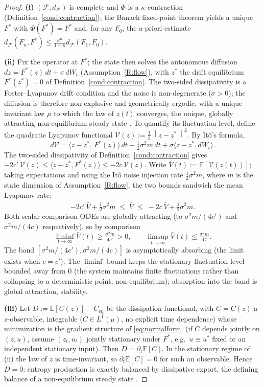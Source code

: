 \documentclass[11pt]{article}
\theoremstyle{plain}
\theoremstyle{definition}
\theoremstyle{remark}
\newcommand{\E}{\mathbb{E}}
\newcommand{\norm}[1]{\left\lVert#1\right\rVert}
\begin{document}
\begin{proof}
\textbf{(i)} $(\mathcal F,d_{\mathcal F})$ is complete and $\Phi$ is a $\kappa$-contraction (Definition~\ref{cond:contraction}); the Banach fixed-point theorem \citep{banach1922} yields a unique $F^*$ with $\Phi(F^*)=F^*$ and, for any $F_0$, the a-priori estimate $d_{\mathcal F}(F_n,F^*)\le\frac{\kappa^n}{1-\kappa}d_{\mathcal F}(F_1,F_0)$.

\textbf{(ii)} Fix the operator at $F^*$; the state then solves the autonomous diffusion $dz=F^*(z)\,dt+\sigma\,dW_t$ (Assumption~\ref{R:flow}), with $z^*$ the drift equilibrium $F^*(z^*)=0$ of Definition~\ref{cond:contraction}. The two-sided dissipativity is a Foster--Lyapunov drift condition and the noise is non-degenerate ($\sigma>0$); the diffusion is therefore non-explosive and geometrically ergodic, with a unique invariant law $\mu$ to which the law of $z(t)$ converges, the unique, globally attracting non-equilibrium steady state \citep{khasminskii2012,mattingly2002}. To quantify its fluctuation level, define the quadratic Lyapunov functional $\mathcal V(z):=\tfrac12\norm{z-z^*}^2$. By It\^o's formula,
\[
d\mathcal V=\big\langle z-z^*,\,F^*(z)\big\rangle\,dt+\tfrac12\sigma^2 m\,dt+\sigma\langle z-z^*,dW_t\rangle .
\]
The two-sided dissipativity of Definition~\ref{cond:contraction} gives $-2c'\,\mathcal V(z)\le\langle z-z^*,F^*(z)\rangle\le-2c\,\mathcal V(z)$. Write $\bar V(t):=\E[\mathcal V(z(t))]$; taking expectations and using the It\^o noise injection rate $\tfrac12\sigma^2 m$, where $m$ is the state dimension of Assumption~\ref{R:flow}, the two bounds sandwich the mean Lyapunov rate:
\[
-2c'\,\bar V+\tfrac12\sigma^2 m\;\le\;\dot{\bar V}\;\le\;-2c\,\bar V+\tfrac12\sigma^2 m .
\]
Both scalar comparison ODEs are globally attracting (to $\sigma^2 m/(4c')$ and $\sigma^2 m/(4c)$ respectively), so by comparison
\[
\liminf_{t\to\infty}\bar V(t)\ge\tfrac{\sigma^2 m}{4c'}>0,\qquad \limsup_{t\to\infty}\bar V(t)\le\tfrac{\sigma^2 m}{4c}.
\]
The band $[\sigma^2 m/(4c'),\sigma^2 m/(4c)]$ is asymptotically absorbing (the limit exists when $c=c'$). The $\liminf$ bound keeps the stationary fluctuation level bounded away from $0$ (the system maintains finite fluctuations rather than collapsing to a deterministic point, non-equilibrium); absorption into the band is global attraction, stability.

\textbf{(iii)} Let $D:=\E[C(z)]-C_{\mathrm{eq}}$ be the dissipation functional, with $C=C(z)$ a $z$-observable, integrable ($C\in L^1(\mu)$, no explicit time dependence) whose minimization is the gradient structure of \eqref{eq:normalform} (if $C$ depends jointly on $(z,u)$, assume $(z_t,u_t)$ jointly stationary under $F^*$, e.g.\ $u\equiv u^*$ fixed or an independent stationary input). Then $\dot D=\partial_t\E[C]$. In the stationary regime of (ii) the law of $z$ is time-invariant, so $\partial_t\E[C]=0$ for such an observable. Hence $\dot D=0$: entropy production is exactly balanced by dissipative export, the defining balance of a non-equilibrium steady state \citep{prigogine1977}.
\end{proof}
\end{document}
